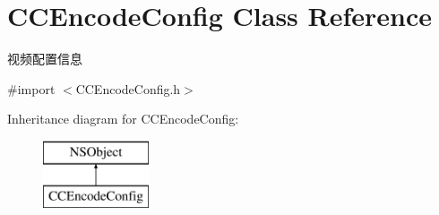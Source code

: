 \hypertarget{interface_c_c_encode_config}{}\section{C\+C\+Encode\+Config Class Reference}
\label{interface_c_c_encode_config}


视频配置信息  




{\ttfamily \#import $<$C\+C\+Encode\+Config.\+h$>$}

Inheritance diagram for C\+C\+Encode\+Config\+:\begin{figure}[H]
\begin{center}
\leavevmode
\includegraphics[height=2.000000cm]{interface_c_c_encode_config}
\end{center}
\end{figure}
